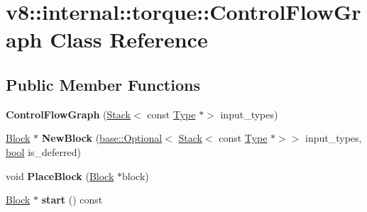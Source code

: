 \hypertarget{classv8_1_1internal_1_1torque_1_1ControlFlowGraph}{}\section{v8\+:\+:internal\+:\+:torque\+:\+:Control\+Flow\+Graph Class Reference}
\label{classv8_1_1internal_1_1torque_1_1ControlFlowGraph}
\subsection*{Public Member Functions}
\begin{DoxyCompactItemize}
\item 
\mbox{\label{classv8_1_1internal_1_1torque_1_1ControlFlowGraph_a79bdb12a3f52780e3419d44b299face7}} 
{\bfseries Control\+Flow\+Graph} (\mbox{\hyperlink{classv8_1_1internal_1_1torque_1_1Stack}{Stack}}$<$ const \mbox{\hyperlink{classv8_1_1internal_1_1torque_1_1Type}{Type}} $\ast$$>$ input\+\_\+types)
\item 
\mbox{\label{classv8_1_1internal_1_1torque_1_1ControlFlowGraph_a72705a69d57c33e68fcd0bdcda5c3df6}} 
\mbox{\hyperlink{classv8_1_1internal_1_1torque_1_1Block}{Block}} $\ast$ {\bfseries New\+Block} (\mbox{\hyperlink{classv8_1_1base_1_1Optional}{base\+::\+Optional}}$<$ \mbox{\hyperlink{classv8_1_1internal_1_1torque_1_1Stack}{Stack}}$<$ const \mbox{\hyperlink{classv8_1_1internal_1_1torque_1_1Type}{Type}} $\ast$$>$$>$ input\+\_\+types, \mbox{\hyperlink{classbool}{bool}} is\+\_\+deferred)
\item 
\mbox{\label{classv8_1_1internal_1_1torque_1_1ControlFlowGraph_ad8a5aa0b7234797eb7447ad6ae1a9400}} 
void {\bfseries Place\+Block} (\mbox{\hyperlink{classv8_1_1internal_1_1torque_1_1Block}{Block}} $\ast$block)
\item 
\mbox{\label{classv8_1_1internal_1_1torque_1_1ControlFlowGraph_aba4bf45ade32d80ec655f57526844ce6}} 
\mbox{\hyperlink{classv8_1_1internal_1_1torque_1_1Block}{Block}} $\ast$ {\bfseries start} () const
\item 
\mbox{\label{classv8_1_1internal_1_1torque_1_1ControlFlowGraph_a87f9c0539c7ac05340820940ca052bc4}} 
$$
\end{DoxyCompactItemize}
